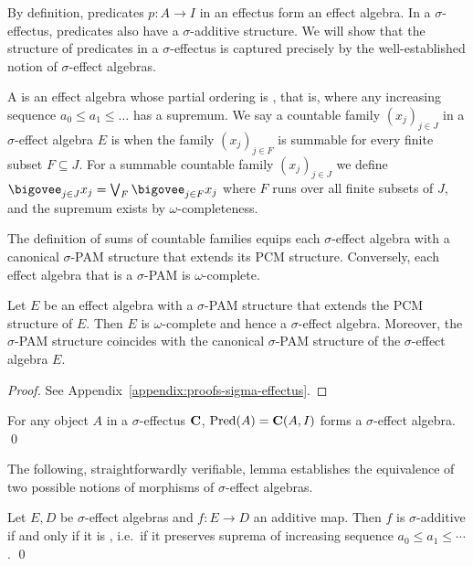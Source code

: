 \documentclass[%
	submission,
copyright,creativecommons,UKenglish]{eptcs}
\begin{document}
By definition,
predicates $p\colon A\to I$ in an effectus form
an effect algebra.
In a $\sigma$-effectus, predicates also have
a $\sigma$-additive structure.
We will show that
the structure of predicates in a $\sigma$-effectus
is captured precisely by the well-established notion of
$\sigma$-effect algebras.

\begin{definition}
\label{def:sigma-effect-algebra}
A 
\cite{Gudder1998,FoulisG2007}
is an effect algebra
whose partial ordering is ,
that is,
where any increasing sequence $a_0\leq a_1\leq \ldots$ has a supremum.
We say a countable family $(x_j)_{j\in J}$ in a $\sigma$-effect algebra $E$
is  when the family $(x_j)_{j\in F}$ is summable
for every finite subset $F\subseteq J$.
For a summable countable family $(x_j)_{j\in J}$
we define $\bigovee_{j\in J} x_j=\bigvee_{F} \bigovee_{j\in F} x_j$
where $F$ runs over all finite subsets of $J$,
and the supremum exists by $\omega$-completeness.
\end{definition}
The definition of sums of countable families 
equips each $\sigma$-effect algebra with 
a canonical $\sigma$-PAM structure
that extends its PCM structure.
Conversely, each effect algebra that is a $\sigma$-PAM is $\omega$-complete.

\begin{proposition}\label{prop:effect-algebra-PAM-iff-complete}
    Let $E$ be an effect algebra with a $\sigma$-PAM structure that extends the PCM structure of $E$. 
    Then $E$ is $\omega$-complete and hence a $\sigma$-effect algebra.
    Moreover, the $\sigma$-PAM structure coincides with the canonical
    $\sigma$-PAM structure of the $\sigma$-effect algebra $E$.
\end{proposition}
\begin{proof}
    See Appendix~\ref{appendix:proofs-sigma-effectus}.
\end{proof}

\begin{corollary}
For any object $A$ in a $\sigma$-effectus $\mathbf{C}$, $\mathrm{Pred}(A)=\mathbf{C}(A,I)$
forms a $\sigma$-effect algebra.
\qed
\end{corollary}

The following, straightforwardly verifiable, lemma
establishes the equivalence of two possible notions of morphisms
of $\sigma$-effect algebras.

\begin{lemma}
\label{lem:sigma-additive-equiv-omega-conti}
Let $E,D$ be $\sigma$-effect algebras
and $f\colon E\to D$ an additive map.
Then $f$ is $\sigma$-additive
if and only if
it is ,
i.e.\ if it preserves suprema of increasing sequence
$a_0\le a_1\le \dotsb$.
\qed
\end{lemma}
\end{document}
